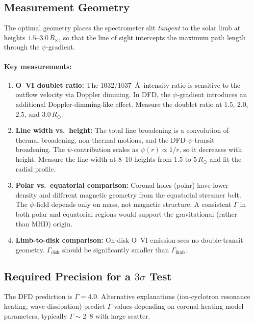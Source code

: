 \documentclass[11pt]{article}
\newcommand{\Rsun}{R_\odot}
\begin{document}
\subsection{Measurement Geometry}

The optimal geometry places the spectrometer slit \textit{tangent}
to the solar limb at heights $1.5$--$3.0\,\Rsun$, so that the
line of sight intercepts the maximum path length through the
$\psi$-gradient.

\paragraph{Key measurements:}
\begin{enumerate}
\item \textbf{O~VI doublet ratio:}
The 1032/1037~\AA\ intensity ratio is sensitive to the outflow
velocity via Doppler dimming.  In DFD, the $\psi$-gradient
introduces an additional Doppler-dimming-like effect.  Measure
the doublet ratio at $1.5$, $2.0$, $2.5$, and $3.0\,\Rsun$.

\item \textbf{Line width vs.\ height:}
The total line broadening is a convolution of thermal broadening,
non-thermal motions, and the DFD $\psi$-transit broadening.  The
$\psi$-contribution scales as $\psi(r) \propto 1/r$, so it
decreases with height.  Measure the line width at 8--10 heights
from $1.5$ to $5\,\Rsun$ and fit the radial profile.

\item \textbf{Polar vs.\ equatorial comparison:}
Coronal holes (polar) have lower density and different magnetic
geometry from the equatorial streamer belt.  The $\psi$-field
depends only on mass, not magnetic structure.  A consistent
$\Gamma$ in both polar and equatorial regions would support the
gravitational (rather than MHD) origin.

\item \textbf{Limb-to-disk comparison:}
On-disk O~VI emission sees no double-transit geometry.
$\Gamma_{\text{disk}}$ should be significantly smaller than
$\Gamma_{\text{limb}}$.
\end{enumerate}

\subsection{Required Precision for a $3\sigma$ Test}

The DFD prediction is $\Gamma = 4.0$.  Alternative explanations
(ion-cyclotron resonance heating, wave dissipation) predict
$\Gamma$ values depending on coronal heating model parameters,
typically $\Gamma \sim 2$--$8$ with large scatter.
\end{document}
